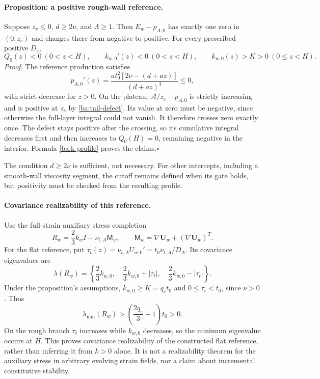 \documentclass[11pt,a4paper]{article}
\numberwithin{equation}{section}
\begin{document}
\paragraph{Proposition: a positive rough-wall reference.}
Suppose $z_v\leq0$, $d\geq2\nu$, and $\Lambda\geq1$. Then
$E_w-p_{A,0}$ has exactly one zero in $(0,z_c)$ and changes there from
negative to positive. For every prescribed positive $D_z$,
\begin{equation}
 \boxed{Q_0(z)<0\ (0<z<H),\qquad
 k_{w,0}'(z)<0\ (0<z<H),\qquad
 k_{w,0}(z)>K>0\ (0\leq z<H).}
 \label{ba:positivity}
\end{equation}
\textit{Proof.}
The reference production satisfies
\[
 p_{A,0}'(z)
 =\frac{a t_0^2[2\nu-(d+az)]}{(d+az)^3}\leq0,
\]
with strict decrease for $z>0$. On the plateau,
$\mathcal A/z_c-p_{A,0}$ is strictly increasing and is positive at $z_c$
by \eqref{ba:tail-defect}. Its value at zero must be negative, since
otherwise the full-layer integral could not vanish. It therefore crosses
zero exactly once. The defect stays positive after the crossing, so its
cumulative integral decreases first and then increases to $Q_0(H)=0$,
remaining negative in the interior. Formula \eqref{ba:k-profile} proves
the claims.\hfill$\square$

The condition $d\geq2\nu$ is sufficient, not necessary. For other
intercepts, including a smooth-wall viscosity segment, the cutoff remains
defined when its gate holds, but positivity must be checked from the
resulting profile.

\paragraph{Covariance realizability of this reference.}
Use the full-strain auxiliary stress completion
\begin{equation}
 R_w=\frac23 k_w I-\nu_{t,A}\mathsf M_w,
 \qquad \mathsf M_w=\nabla\boldsymbol U_w+
                         (\nabla\boldsymbol U_w)^T.
 \label{ba:inner-stress-definition}
\end{equation}
For the flat reference, put
$\tau_t(z)=\nu_{t,A}U_{w,0}'=t_0\nu_{t,A}/D_A$. Its covariance
eigenvalues are
\begin{equation}
 \lambda(R_w)=
 \left\{\frac23k_{w,0},\quad
        \frac23k_{w,0}+|\tau_t|,\quad
        \frac23k_{w,0}-|\tau_t|\right\}.
 \label{ba:inner-covariance}
\end{equation}
Under the proposition's assumptions, $k_{w,0}\geq K=q_et_0$ and
$0\leq\tau_t<t_0$, since $\nu>0$. Thus
\begin{equation}
 \boxed{\lambda_{\min}(R_w)
 >\left(\frac{2q_e}{3}-1\right)t_0>0.}
 \label{ba:reference-realizability}
\end{equation}
On the rough branch $\tau_t$ increases while $k_{w,0}$ decreases, so
the minimum eigenvalue occurs at $H$. This proves covariance
realizability of the constructed flat reference, rather than inferring it
from $k>0$ alone. It is not a realizability theorem for the auxiliary
stress in arbitrary evolving strain fields, nor a claim about incremental
constitutive stability.
\end{document}
